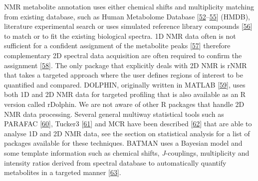 \documentclass[]{article}
\begin{document}
NMR metabolite annotation uses either chemical shifts and multiplicity matching from existing database, such as Human Metabolome Database {[}\protect\hyperlink{ref-wishart_2009}{52}--\protect\hyperlink{ref-wishart_2018}{55}{]} (HMDB), literature experimental search or uses simulated reference library compounds {[}\protect\hyperlink{ref-beckonert_2007}{56}{]} to match or to fit the existing biological spectra. 1D NMR data often is not sufficient for a confident assignment of the metabolite peaks {[}\protect\hyperlink{ref-pudakalakatti_2014}{57}{]} therefore complementary 2D spectral data acquisition are often required to confirm the assignment {[}\protect\hyperlink{ref-ludwig_2010}{58}{]}. The only package that explicitly deals with 2D NMR is rNMR that takes a targeted approach where the user defines regions of interest to be quantified and compared. DOLPHIN, originally written in MATLAB {[}\protect\hyperlink{ref-gmez_2014}{59}{]}, uses both 1D and 2D NMR data for targeted profiling that is also available as an R version called rDolphin. We are not aware of other R packages that handle 2D NMR data processing. Several general multiway statistical tools such as PARAFAC {[}\protect\hyperlink{ref-shinzawa_2012}{60}{]}, Tucker3 {[}\protect\hyperlink{ref-chen_2018}{61}{]} and MCR have been described {[}\protect\hyperlink{ref-pedersen_2006}{62}{]} that are able to analyse 1D and 2D NMR data, see the section on statistical analysis for a list of packages available for these techniques. BATMAN uses a Bayesian model and some template information such as chemical shifts, \emph{J}-couplings, multiplicity and intensity ratios derived from spectral database to automatically quantify metabolites in a targeted manner {[}\protect\hyperlink{ref-hao_2012}{63}{]}.
\end{document}
